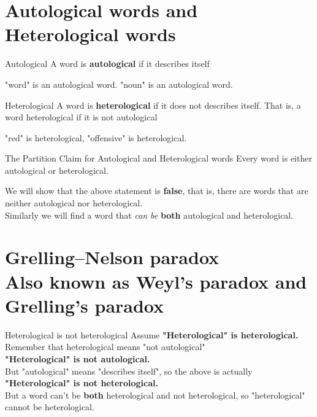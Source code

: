 \section[Auto-Hetero Words]{Autological words and Heterological words}
\begin{frame}
	\begin{block}{Autological}
		A word is \textbf{autological} if it describes itself
	\end{block}\pause
	"word" is an autological word. "noun" is an autological word.\pause
	\begin{block}{Heterological}
		A word is \textbf{heterological} if it does not describes itself. That is, a word heterological if it is not autological
	\end{block}\pause
	"red" is heterological, "offensive" is heterological.
\end{frame}

\begin{frame}
	\begin{block}{The Partition Claim for Autological and Heterological words}
		Every word is either autological or heterological.
	\end{block}\pause
	We will show that the above statement is \textbf{false}, that is, there are words that are neither autological nor heterological.\pause\\
	Similarly we will find a word that \textit{can be} \textbf{both} autological and heterological.
\end{frame}

\section[Paradox]{Grelling–Nelson paradox\\\small Also known as Weyl's paradox and Grelling's paradox}
\begin{frame}{Heterological is not heterological}
	Assume \textbf{"Heterological" is heterological.}\pause\\
	Remember that heterological means "not autological"\pause\\
	\textbf{"Heterological" is not autological.}\pause\\
	But "autological" means "describes itself", so the above is actually\pause\\
	\textbf{"Heterological" is not heterological.}\pause\\
	But a word can't be \textbf{both} heterological and not heterological, so "heterological" cannot be heterological.
\end{frame}

